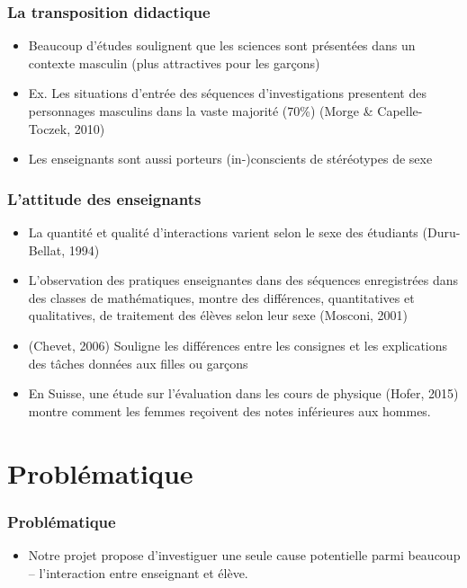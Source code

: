 \documentclass{beamer}
\begin{document}
\begin{frame}
\frametitle{La transposition didactique}
\begin{itemize}
\item Beaucoup d’études soulignent que les sciences sont présentées dans un contexte masculin (plus attractives pour les garçons)
\item Ex. Les situations d’entrée des séquences d’investigations presentent des personnages masculins dans la vaste majorité (70\%) (Morge & Capelle-Toczek, 2010)
\item Les enseignants sont aussi porteurs (in-)conscients de stéréotypes de sexe
\end{itemize}
\end{frame}

\begin{frame}
\frametitle{L'attitude des enseignants}
\begin{itemize}
\item La quantité et qualité d’interactions varient  selon le sexe des étudiants (Duru-Bellat, 1994)
\item L'observation des pratiques enseignantes dans des séquences enregistrées dans des classes de mathématiques, montre des différences, quantitatives et qualitatives, de traitement des élèves selon leur sexe (Mosconi, 2001)
\item (Chevet, 2006) Souligne les différences entre les consignes et les explications des tâches données aux filles ou garçons
\item En Suisse, une étude sur l’évaluation dans les cours de physique (Hofer, 2015) montre comment les femmes reçoivent des notes inférieures aux hommes.
\end{itemize}
\end{frame}

\section{Problématique}
\begin{frame}
\frametitle{Problématique}
\begin{itemize}
\item Notre projet propose d'investiguer une seule cause potentielle parmi beaucoup -- l'interaction entre enseignant et élève.
\end{itemize}
\end{frame}
\end{document}
